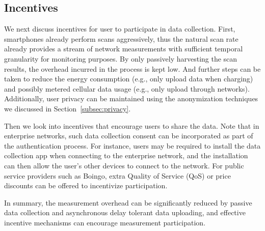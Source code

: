 \subsection{Incentives}
\label{subsec:incentive}

We next discuss incentives for user to participate in data collection. First,
smartphones already perform \wifi{} scans aggressively, thus the natural scan
rate already provides a stream of network measurements with sufficient temporal
granularity for monitoring purposes. By only passively harvesting the scan
results, the overhead incurred in the process is kept low. And further steps can
be taken to reduce the energy consumption (e.g., only upload data when charging)
and possibly metered cellular data usage (e.g., only upload through \wifi{}
networks).  Additionally, user privacy can be maintained using the anonymization
techniques we discussed in Section~\ref{subsec:privacy}.

Then we look into incentives that encourage users to share the data. Note that
in enterprise networks, such data collection consent can be incorporated as part
of the authentication process. For instance, users may be required to install
the data collection app when connecting to the enterprise network, and the
installation can then allow the user's other devices to connect to the network.
For public \wifi{} service providers such as Boingo, extra Quality
of Service (QoS) or price discounts can be offered to incentivize
participation.

In summary, the measurement overhead can be significantly reduced by passive
data collection and asynchronous delay tolerant data uploading, and effective
incentive mechanisms can encourage measurement participation.

